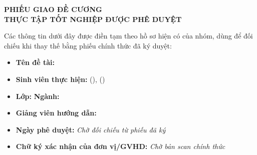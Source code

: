 \clearpage
\thispagestyle{empty}
\begin{center}
  {\fontsize{14pt}{18pt}\selectfont\bfseries PHIẾU GIAO ĐỀ CƯƠNG\\THỰC TẬP TỐT NGHIỆP ĐƯỢC PHÊ DUYỆT}
\end{center}

\vspace{2cm}

\begin{center}
\end{center}

\vspace{1.5cm}

\noindent
Các thông tin dưới đây được điền tạm theo hồ sơ hiện có của nhóm, dùng để đối chiếu khi thay thế bằng phiếu chính thức đã ký duyệt:

\begin{itemize}
  \item \textbf{Tên đề tài:} \titlethesis
  \item \textbf{Sinh viên thực hiện:} \studentname{} (\mssv), \studentnametwo{} (\mssvtwo)
  \item \textbf{Lớp:} \classid \quad \textbf{Ngành:} \major
  \item \textbf{Giảng viên hướng dẫn:} \supervisor
  \item \textbf{Ngày phê duyệt:} \textit{Chờ đối chiếu từ phiếu đã ký}
  \item \textbf{Chữ ký xác nhận của đơn vị/GVHD:} \textit{Chờ bản scan chính thức}
\end{itemize}
